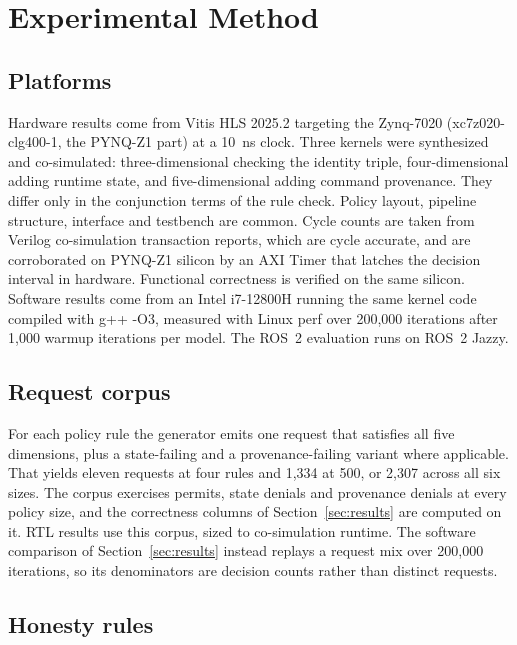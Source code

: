 \documentclass[conference]{IEEEtran}
\newcommand{\new}[1]{#1}
\begin{document}
\section{Experimental Method}
\label{sec:method}

\subsection{Platforms}

Hardware results come from Vitis HLS 2025.2 targeting the Zynq-7020 (xc7z020-clg400-1, the PYNQ-Z1 part) at a 10~ns clock. \new{Three kernels were synthesized and co-simulated: three-dimensional checking the identity triple, four-dimensional adding runtime state, and five-dimensional adding command provenance. They differ only in the conjunction terms of the rule check. Policy layout, pipeline structure, interface and testbench are common.} Cycle counts are taken from Verilog co-simulation transaction reports, which are cycle accurate\new{, and are corroborated on PYNQ-Z1 silicon by an AXI Timer that latches the decision interval in hardware}. Functional correctness is verified on the same silicon. Software results come from an Intel i7-12800H running the same kernel code compiled with g++ -O3, measured with Linux perf over 200{,}000 iterations after 1{,}000 warmup iterations per model. The ROS~2 evaluation runs on ROS~2 Jazzy.

\subsection{Request corpus}

For each policy rule the generator emits one request that satisfies all five dimensions, plus a state-failing and a provenance-failing variant where applicable. That yields eleven requests at four rules and 1{,}334 at 500, or 2{,}307 across all six sizes. The corpus exercises permits, state denials and provenance denials at every policy size, and the correctness columns of Section~\ref{sec:results} are computed on it. \new{RTL results use this corpus, sized to co-simulation runtime. The software comparison of Section~\ref{sec:results} instead replays a request mix over 200{,}000 iterations, so its denominators are decision counts rather than distinct requests.}

\subsection{Honesty rules}
\end{document}
